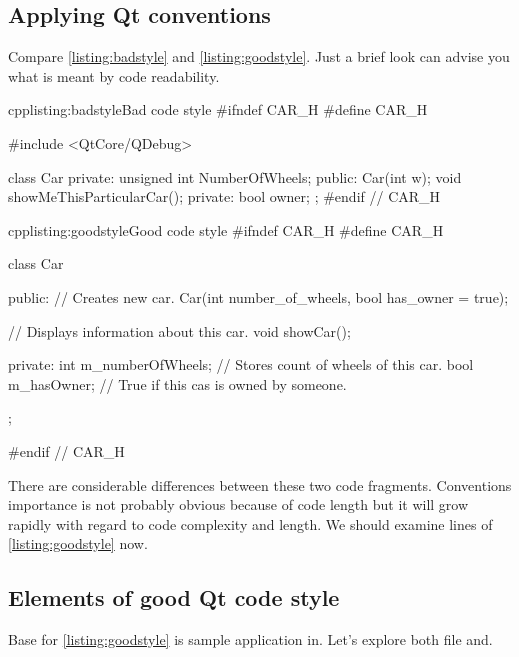 \subsection{Applying Qt conventions}
Compare \autoref{listing:badstyle} and \autoref{listing:goodstyle}. Just a brief look can advise you what is meant by code readability.
\begin{fdoccode}{cpp}{listing:badstyle}{Bad code style}
#ifndef CAR_H
#define CAR_H

#include <QtCore/QDebug>


class Car {
    private:
		unsigned int NumberOfWheels;
    public:
		Car(int w);
		void showMeThisParticularCar();
    private:
		bool owner;
};
#endif // CAR_H
\end{fdoccode}

\begin{fdoccode}{cpp}{listing:goodstyle}{Good code style}
#ifndef CAR_H
#define CAR_H


class Car {
    public:
		// Creates new car.
		Car(int number_of_wheels, bool has_owner = true);

		// Displays information about this car.
		void showCar();

    private:
		int m_numberOfWheels; // Stores count of wheels of this car.
		bool m_hasOwner; // True if this cas is owned by someone.
};

#endif // CAR_H
\end{fdoccode}

There are considerable differences between these two code fragments. Conventions importance is not probably obvious because of code length but it will grow rapidly with regard to code complexity and length. We should examine lines of \autoref{listing:goodstyle} now.

\subsection{Elements of good Qt code style}
Base for \autoref{listing:goodstyle} is sample application in. Let's explore both file and.

